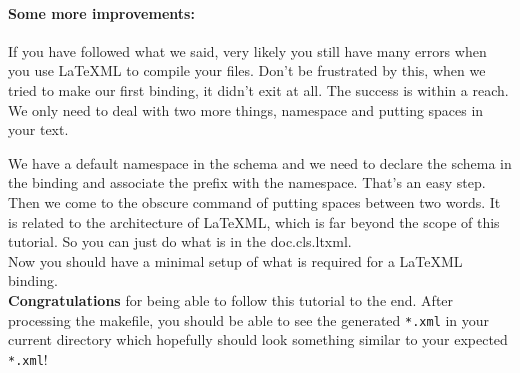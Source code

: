 \documentclass{article}
\begin{document}
\paragraph{Some more improvements:} If you have followed what we said, very likely you still have many errors when you use \LaTeX ML to compile your files. Don't be frustrated by this, when we tried to make our first binding, it didn't exit at all. The success is within a reach. We only need to deal with two more things, namespace and putting spaces in your text. 

\noindent We have a default namespace in the schema and we need to declare the schema in the binding and associate the prefix with the namespace. That's an easy step. Then we come to the obscure command of putting spaces between two words. It is related to the architecture of \LaTeX ML, which is far beyond the scope of this tutorial. So you can just do what is in the doc.cls.ltxml.\\
 
Now you should have a minimal setup of what is required for a \LaTeX ML binding. \\ 

\noindent\textbf{Congratulations} for being able to follow this tutorial to the end. After processing the makefile, you should be able to see the generated \texttt{*.xml} in your current directory which hopefully should look something similar to your expected \texttt{*.xml}! \\
\end{document}
